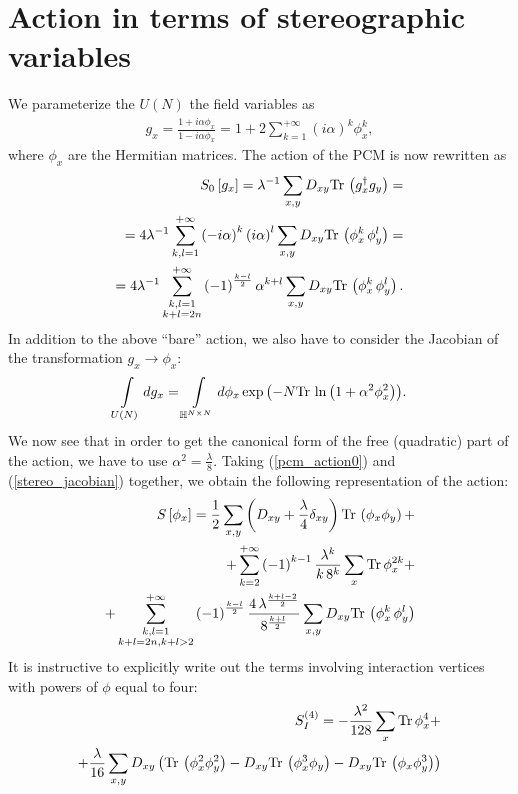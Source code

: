 \documentclass[12pt]{article}
\newcommand{\lr}[1]{ \left( #1 \right) }
\newcommand{\lrs}[1]{ \left[ #1 \right] }
\newcommand{\tr}{ {\rm Tr} \, }
\newcommand{\expa}[1]{ \exp{\left( #1 \right)} }
\begin{document}
\section{Action in terms of stereographic variables}
\label{sec:action_stereo}

 We parameterize the $U\lr{N}$ the field variables as
\begin{eqnarray}
\label{stereographic_projection}
 g_x
 =
 \frac{1 + i \alpha \phi_x}{1 - i \alpha \phi_x}
 =
 1 + 2 \sum\limits_{k=1}^{+\infty} \lr{i \alpha}^k \phi_x^k
,
\end{eqnarray}
where $\phi_x$ are the Hermitian matrices. The action of the PCM is now rewritten as
\begin{eqnarray}
\label{pcm_action0}
 S_0\lrs{g_x} = \lambda^{-1} \sum\limits_{x,y} D_{x y} \tr\lr{g^{\dag}_x g_y}
 = \nonumber\\ =
 4 \lambda^{-1} \sum\limits_{k,l=1}^{+\infty} \lr{-i \alpha}^k \lr{i \alpha}^l
      \sum\limits_{x,y} D_{xy} \tr\lr{\phi_x^k \, \phi_y^l}
 = \nonumber\\ =
 4 \lambda^{-1} \sum\limits_{\substack{k,l=1\\k+l=2 n}}^{+\infty}
  \lr{-1}^{\frac{k-l}{2}} \alpha^{k+l}
       \sum\limits_{x,y} D_{xy} \tr\lr{\phi_x^k \, \phi_y^l} .
\end{eqnarray}
In addition to the above ``bare'' action, we also have to consider the Jacobian of the transformation $g_x \rightarrow \phi_x$:
\begin{eqnarray}
\label{stereo_jacobian}
 \int\limits_{U\lr{N}} dg_x = \int\limits_{\mathbb{H}^{N\times N}} d\phi_x \expa{-N \tr\ln\lr{1 + \alpha^2 \phi_x^2}} .
\end{eqnarray}
We now see that in order to get the canonical form of the free (quadratic) part of the action, we have to use $\alpha^2 = \frac{\lambda}{8}$. Taking (\ref{pcm_action0}) and (\ref{stereo_jacobian}) together, we obtain the following representation of the action:
\begin{eqnarray}
\label{pcm_action}
 S\lrs{\phi_x} =
 \frac{1}{2} \sum\limits_{x,y} \lr{D_{xy} + \frac{\lambda}{4} \delta_{x y}} \tr\lr{\phi_x \phi_y}
 + \nonumber \\ +
 \sum\limits_{k=2}^{+\infty} \lr{-1}^{k-1} \frac{\lambda^{k}}{k \, 8^k} \sum\limits_x \tr \phi_x^{2 k}
 + \nonumber \\ +
 \sum\limits_{\substack{k,l=1\\k+l=2 n,k+l>2}}^{+\infty}
  \lr{-1}^{\frac{k-l}{2}} \frac{4 \, \lambda^{\frac{k+l-2}{2}}}{8^{\frac{k+l}{2}}}
       \sum\limits_{x,y} D_{xy} \tr\lr{\phi_x^k \, \phi_y^l}
\end{eqnarray}
It is instructive to explicitly write out the terms involving interaction vertices with powers of $\phi$ equal to four:
\begin{eqnarray}
\label{interaction_action_phi4}
 S_I^{\lr{4}} = - \frac{\lambda^2}{128} \sum\limits_x \tr \phi_x^4
 + \nonumber \\ +
 \frac{\lambda}{16} \sum\limits_{x, y} D_{x y} \lr{\tr\lr{\phi_x^2 \phi_y^2} - D_{x y} \tr\lr{\phi_x^3 \phi_y} - D_{x y} \tr\lr{\phi_x \phi_y^3} }
\end{eqnarray}
\end{document}

